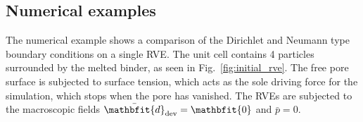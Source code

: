 \documentclass[notitlepage,a4paper,fleqn,9pt]{extarticle}
\renewcommand{\ta}[1]{\mathbfit{#1}}
\renewcommand{\ts}[1]{\mathbfit{#1}}
\renewcommand{\Box}{\mdlgwhtsquare}
\newcommand{\jump}[1]{[\![#1]\!]}
\newcommand{\Periodic}{\mathrm{P}}
\newcommand{\figref}[1]{Fig.~\ref{#1}}
\begin{document}
\begin{multicols}{2}

\section{Numerical examples}

The numerical example shows a comparison of the Dirichlet and Neumann type boundary conditions on a single RVE.
The unit cell contains 4 particles surrounded by the melted binder, as seen in \figref{fig:initial_rve}.
The free pore surface is subjected to surface tension, which acts as the sole driving force for the simulation, which stops when the pore has vanished.
The RVEs are subjected to the macroscopic fields $\bar{\ts d}_\dev = \ts 0$ and $\bar{p} = 0$.


\end{multicols}
\end{document}

